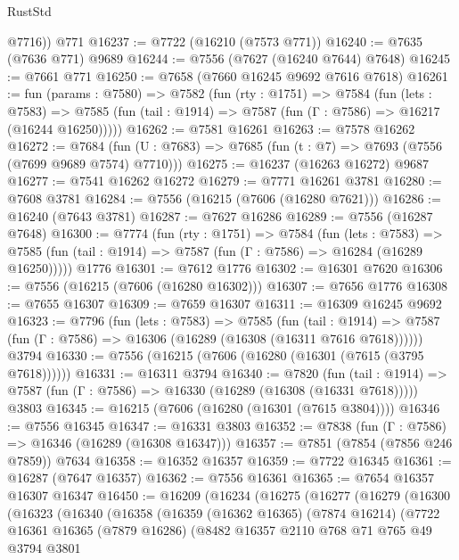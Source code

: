 \begin{lexlean}{RustStd}
\begin{coremodule}
        @7716))
    @771
@16237 := @7722 (@16210 (@7573 @771))
@16240 := @7635 (@7636 @771) @9689
@16244 := @7556 (@7627 (@16240 @7644) @7648)
@16245 := @7661 @771
@16250 := @7658 (@7660 @16245 @9692 @7616 @7618)
@16261 := fun (params : @7580) =>
  @7582
    (fun (rty : @1751) =>
    @7584
      (fun (lets : @7583) =>
      @7585 (fun (tail : @1914) => @7587 (fun (Γ : @7586) => @16217 (@16244 @16250)))))
@16262 := @7581 @16261
@16263 := @7578 @16262
@16272 := @7684 (fun (U : @7683) => @7685 (fun (t : @7) => @7693 (@7556 (@7699 @9689 @7574) @7710)))
@16275 := @16237 (@16263 @16272) @9687
@16277 := @7541 @16262 @16272
@16279 := @7771 @16261 @3781
@16280 := @7608 @3781
@16284 := @7556 (@16215 (@7606 (@16280 @7621)))
@16286 := @16240 (@7643 @3781)
@16287 := @7627 @16286
@16289 := @7556 (@16287 @7648)
@16300 := @7774
    (fun (rty : @1751) =>
    @7584
      (fun (lets : @7583) =>
      @7585 (fun (tail : @1914) => @7587 (fun (Γ : @7586) => @16284 (@16289 @16250)))))
    @1776
@16301 := @7612 @1776
@16302 := @16301 @7620
@16306 := @7556 (@16215 (@7606 (@16280 @16302)))
@16307 := @7656 @1776
@16308 := @7655 @16307
@16309 := @7659 @16307
@16311 := @16309 @16245 @9692
@16323 := @7796
    (fun (lets : @7583) =>
    @7585
      (fun (tail : @1914) =>
      @7587 (fun (Γ : @7586) => @16306 (@16289 (@16308 (@16311 @7616 @7618))))))
    @3794
@16330 := @7556 (@16215 (@7606 (@16280 (@16301 (@7615 (@3795 @7618))))))
@16331 := @16311 @3794
@16340 := @7820
    (fun (tail : @1914) => @7587 (fun (Γ : @7586) => @16330 (@16289 (@16308 (@16331 @7618)))))
    @3803
@16345 := @16215 (@7606 (@16280 (@16301 (@7615 @3804))))
@16346 := @7556 @16345
@16347 := @16331 @3803
@16352 := @7838 (fun (Γ : @7586) => @16346 (@16289 (@16308 @16347)))
@16357 := @7851 (@7854 (@7856 @246 @7859)) @7634
@16358 := @16352 @16357
@16359 := @7722 @16345
@16361 := @16287 (@7647 @16357)
@16362 := @7556 @16361
@16365 := @7654 @16357 @16307 @16347
@16450 := @16209
    (@16234
      (@16275
        (@16277
          (@16279
            (@16300
              (@16323
                (@16340
                  (@16358
                    (@16359
                      (@16362 @16365)
                      (@7874 @16214)
                      (@7722
                        @16361
                        @16365
                        (@7879 @16286)
                        (@8482
                          @16357
                          @2110
                          @768
                          @71
                          @765
                          @49
                          @3794
                          @3801

\end{coremodule}
\end{lexlean}

